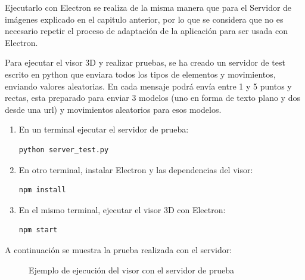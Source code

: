 Ejecutarlo con Electron se realiza de la misma manera que para el Servidor de imágenes explicado en el capitulo anterior, por lo que se considera que no es necesario repetir el proceso de adaptación de la aplicación para ser usada con Electron.

Para ejecutar el visor 3D y realizar pruebas, se ha creado un servidor de test escrito en python que enviara todos los tipos de elementos y movimientos, enviando valores aleatorias. En cada mensaje podrá envía entre 1 y 5 puntos y rectas, esta preparado para enviar 3 modelos (uno en forma de texto plano y dos desde una url) y movimientos aleatorios para esos modelos.

\begin{enumerate}
\item En un terminal ejecutar el servidor de prueba:
\begin{lstlisting}[frame=single]
python server_test.py
\end{lstlisting}
\item En otro terminal, instalar Electron y las dependencias del visor:
\begin{lstlisting}[frame=single]
npm install
\end{lstlisting}
\item En el mismo terminal, ejecutar el visor 3D con Electron:
\begin{lstlisting}[frame=single]
npm start
\end{lstlisting}
\end{enumerate}

A continuación se muestra la prueba realizada con el servidor:

\begin{figure}[H]
  \begin{center}
    \caption{Ejemplo de ejecución del visor con el servidor de prueba}
     \label{fig.ejemplo3dviz}
     \end{center}
\end{figure}













